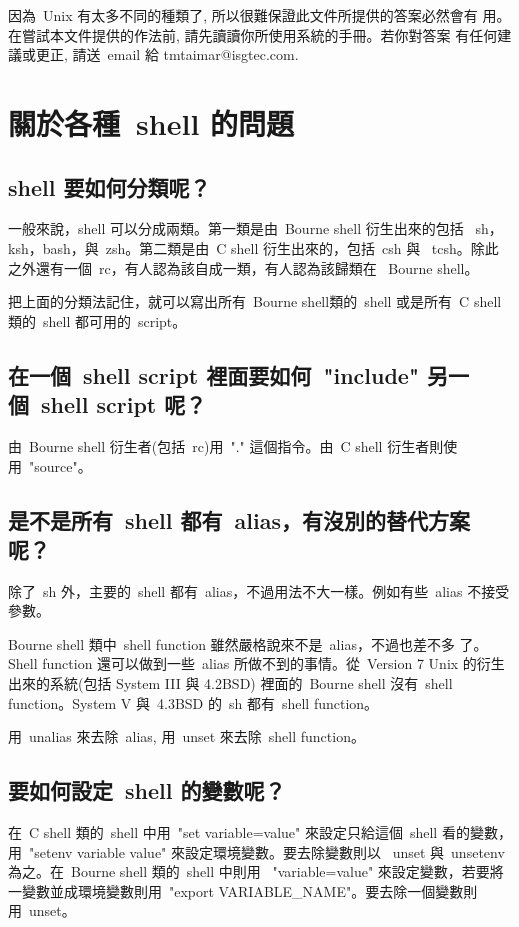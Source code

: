\documentclass{article}
\begin{document}
\begin{CJK*}{Bg5}{ming}
因為~Unix 有太多不同的種類了, 所以很難保證此文件所提供的答案必然會有
用。在嘗試本文件提供的作法前, 請先讀讀你所使用系統的手冊。若你對答案
有任何建議或更正, 請送~email 給 tmtaimar@isgtec.com.

\setcounter{section}{4}
\section{關於各種~shell 的問題}
\subsection{shell 要如何分類呢？}

	一般來說，shell 可以分成兩類。第一類是由~Bourne shell 衍生出來的包括 
	~sh，ksh，bash，與~zsh。第二類是由~C shell 衍生出來的，包括~csh 與 
	~tcsh。除此之外還有一個~rc，有人認為該自成一類，有人認為該歸類在 
	~Bourne shell。

	把上面的分類法記住，就可以寫出所有~Bourne shell類的~shell 或是所有~C 
	shell 類的~shell 都可用的~script。

\subsection{在一個~shell script 裡面要如何~"include" 另一個~shell script 呢？}

	由~Bourne shell 衍生者(包括~rc)用~"." 這個指令。由~C shell 衍生者則使
        用~"source"。

\subsection{是不是所有~shell 都有~alias，有沒別的替代方案呢？ }

	除了~sh 外，主要的~shell 都有~alias，不過用法不大一樣。例如有些~alias 
        不接受參數。

	Bourne shell 類中~shell function 雖然嚴格說來不是~alias，不過也差不多
	了。Shell function 還可以做到一些~alias 所做不到的事情。從~Version 7 
	Unix 的衍生出來的系統(包括 System III 與 4.2BSD) 裡面的~Bourne shell 
	沒有~shell function。System V 與~4.3BSD 的~sh 都有~shell function。

	用~unalias 來去除~alias, 用~unset 來去除~shell function。

\subsection{要如何設定~shell 的變數呢？}

	在~C shell 類的~shell 中用~"set variable=value" 來設定只給這個~shell 
        看的變數，用~"setenv variable value" 來設定環境變數。要去除變數則以 
       ~unset 與~unsetenv 為之。在~Bourne shell 類的~shell 中則用 
       ~"variable=value" 來設定變數，若要將一變數並成環境變數則用~"export 
       VARIABLE\_NAME"。要去除一個變數則用~unset。 


\end{CJK*}
\end{document}
